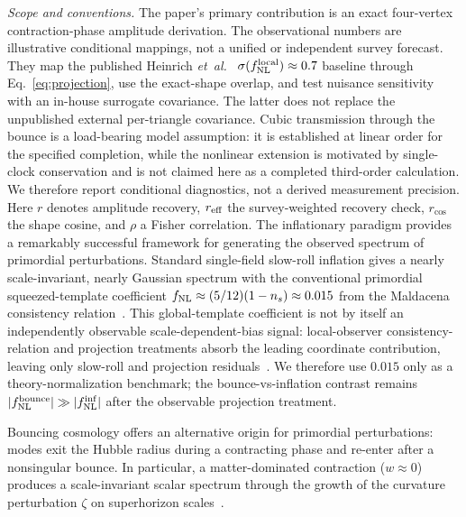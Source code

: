\documentclass[aps,prd,twocolumn,superscriptaddress,showpacs,preprintnumbers,nofootinbib,longbibliography,floatfix]{revtex4-2}
\newcommand{\fnl}{f_{\rm NL}}
\newcommand{\etal}{\textit{et~al.}}
\begin{document}
\emph{Scope and conventions.} The paper's primary contribution is an exact four-vertex contraction-phase amplitude derivation. The observational numbers are illustrative conditional mappings, not a unified or independent survey forecast. They map the published Heinrich \etal~\cite{Heinrich:2023} $\sigma(\fnl^{\rm local})\approx0.7$ baseline through Eq.~\eqref{eq:projection}, use the exact-shape overlap, and test nuisance sensitivity with an in-house surrogate covariance. The latter does not replace the unpublished external per-triangle covariance. Cubic transmission through the bounce is a load-bearing model assumption: it is established at linear order for the specified completion, while the nonlinear extension is motivated by single-clock conservation and is not claimed here as a completed third-order calculation. We therefore report conditional diagnostics, not a derived measurement precision. Here $r$ denotes amplitude recovery, $r_{\rm eff}$ the survey-weighted recovery check, $r_{\cos}$ the shape cosine, and $\rho$ a Fisher correlation.
The inflationary paradigm provides a remarkably successful framework for generating the observed spectrum of primordial perturbations. Standard single-field slow-roll inflation gives a nearly scale-invariant, nearly Gaussian spectrum with the conventional primordial squeezed-template coefficient $\fnl \approx (5/12)(1-n_s) \approx 0.015$ from the Maldacena consistency relation~\cite{Maldacena:2002vr}. This global-template coefficient is not by itself an independently observable scale-dependent-bias signal: local-observer consistency-relation and projection treatments absorb the leading coordinate contribution, leaving only slow-roll and projection residuals~\cite{Pajer:2013,TanakaUrakawa:2011}. We therefore use $0.015$ only as a theory-normalization benchmark; the bounce-vs-inflation contrast remains $|\fnl^{\rm bounce}| \gg |\fnl^{\rm inf}|$ after the observable projection treatment.

Bouncing cosmology offers an alternative origin for primordial perturbations: modes exit the Hubble radius during a contracting phase and re-enter after a nonsingular bounce. In particular, a matter-dominated contraction ($w \approx 0$) produces a scale-invariant scalar spectrum through the growth of the curvature perturbation $\zeta$ on superhorizon scales~\cite{Wands:1998yp,Finelli:2001sr}.
\end{document}
